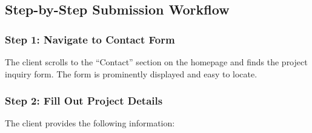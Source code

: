 \documentclass[12pt]{article}
\begin{document}
\subsection{Step-by-Step Submission Workflow}

\subsubsection{Step 1: Navigate to Contact Form}
The client scrolls to the ``Contact'' section on the homepage and finds the project inquiry form. The form is prominently displayed and easy to locate.

\subsubsection{Step 2: Fill Out Project Details}
The client provides the following information:
\end{document}
